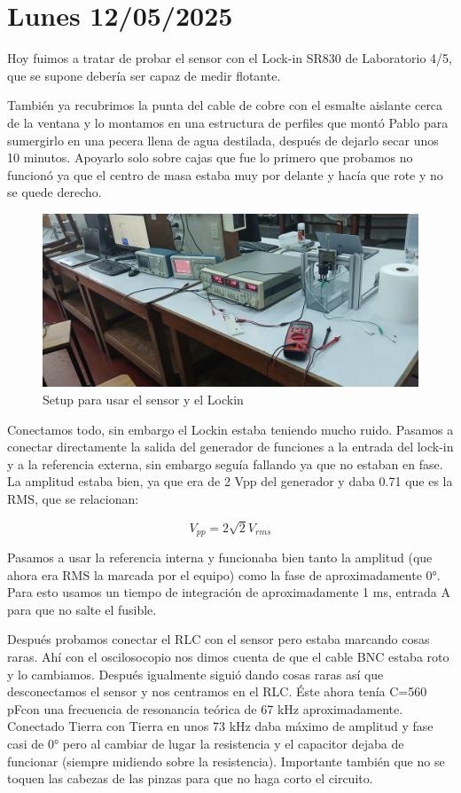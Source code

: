 \section{Lunes 12/05/2025}
Hoy fuimos a tratar de probar el sensor con el Lock-in SR830 de Laboratorio 4/5, que se supone debería ser capaz de medir flotante. 

También ya recubrimos la punta del cable de cobre con el esmalte aislante cerca de la ventana y lo montamos en una estructura de perfiles que montó Pablo para sumergirlo en una pecera llena de agua destilada, después de dejarlo secar unos 10 minutos. Apoyarlo solo sobre cajas que fue lo primero que probamos no funcionó ya que el centro de masa estaba muy por delante y hacía que rote y no se quede derecho. 

\begin{figure}[!ht]
	\centering
	\includegraphics[width=0.7\linewidth]{Figures/12_05_2025/20250512_113406.jpg}
	\caption{Setup para usar el sensor y el Lockin}
	\label{fig:foto_12_05_2025}
\end{figure}

Conectamos todo, sin embargo el Lockin estaba teniendo mucho ruido. Pasamos a conectar directamente la salida del generador de funciones a la entrada del lock-in y a la referencia externa, sin embargo seguía fallando ya que no estaban en fase. La amplitud estaba bien, ya que era de 2 Vpp del generador y daba 0.71 que es la RMS, que se relacionan:

\begin{equation}
	V_{pp} = 2\sqrt{2} V_{rms} %
\end{equation} 

Pasamos a usar la referencia interna y funcionaba bien tanto la amplitud (que ahora era RMS la marcada por el equipo) como la fase de aproximadamente 0°. Para esto usamos un tiempo de integración de aproximadamente 1 ms, entrada A para que no salte el fusible. %

Después probamos conectar el RLC con el sensor pero estaba marcando cosas raras. Ahí con el oscilosocopio nos dimos cuenta de que el cable BNC estaba roto y lo cambiamos. Después igualmente siguió dando cosas raras así que desconectamos el sensor y nos centramos en el RLC. Éste ahora tenía C=560 pFcon una frecuencia de resonancia teórica de 67 kHz aproximadamente. Conectado Tierra con Tierra en unos 73 kHz daba máximo de amplitud y fase casi de 0° pero al cambiar de lugar la resistencia y el capacitor dejaba de funcionar (siempre midiendo sobre la resistencia).  Importante también que no se toquen las cabezas de las pinzas para que no haga corto el circuito. %

